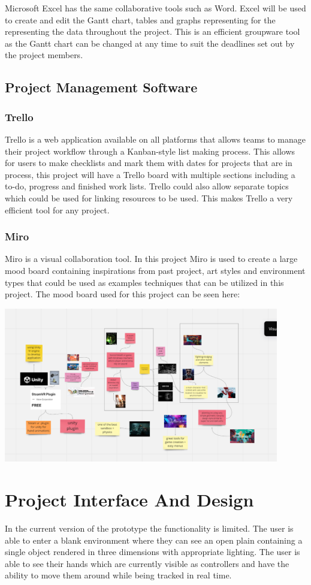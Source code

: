 Microsoft Excel has the same collaborative tools such as Word. Excel will be used to create and edit the Gantt chart, tables  and graphs representing for the representing the data throughout the project. This is an efficient groupware tool as the Gantt chart can be changed at any time to suit the deadlines set out by the project members. 

\section{Project Management Software}
\subsection{Trello}
Trello is a web application available on all platforms that allows teams to manage their project workflow through a Kanban-style list making process. This allows for users to make checklists and mark them with dates for projects that are in process, this project will have a Trello board with multiple sections including a to-do, progress and finished work lists. Trello could also allow separate topics which could be used for linking resources to be used. This makes Trello a very efficient tool for any project. 

\subsection{Miro}
Miro is a visual collaboration tool. In this project Miro is used to create a large mood board containing inspirations from past project, art styles and environment types that could be used as examples techniques that can be utilized in this project. The mood board used for this project can be seen here:

 \includegraphics[width=12cm]{Chapters/Picture1.png}

\chapter{Project Interface And Design}
In the current version of the prototype the functionality is limited. The user is able to enter a blank environment where they can see an open plain containing a single object rendered in three dimensions with appropriate lighting. The user is able to see their hands which are currently visible as controllers and have the ability to move them around while being tracked in real time. 

